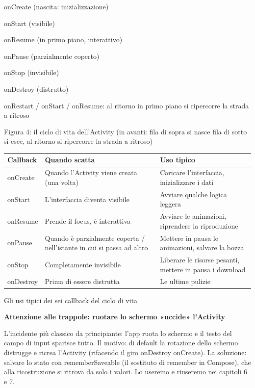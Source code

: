 onCreate (nascita: inizializzazione)

onStart (visibile)

onResume (in primo piano, interattivo)

onPause (parzialmente coperto)

onStop (invisibile)

onDestroy (distrutto)

onRestart / onStart / onResume: al ritorno in primo piano si ripercorre la strada a ritroso

\begin{center}\small\color{gray}Figura 4: il ciclo di vita dell'Activity (in avanti: fila di sopra si nasce fila di sotto si esce, al ritorno si ripercorre la strada a ritroso)\end{center}

\begin{center}
\begin{tabularx}{\linewidth}{|X|X|X|}
\hline
\textbf{Callback} & \textbf{Quando scatta} & \textbf{Uso tipico} \tabularnewline
\hline
onCreate & Quando l'Activity viene creata (una volta) & Caricare l'interfaccia, inizializzare i dati \tabularnewline
onStart & L'interfaccia diventa visibile & Avviare qualche logica leggera \tabularnewline
onResume & Prende il focus, è interattiva & Avviare le animazioni, riprendere la riproduzione \tabularnewline
onPause & Quando è parzialmente coperta / nell'istante in cui si passa ad altro & Mettere in pausa le animazioni, salvare la bozza \tabularnewline
onStop & Completamente invisibile & Liberare le risorse pesanti, mettere in pausa i download \tabularnewline
onDestroy & Prima di essere distrutta & Le ultime pulizie \tabularnewline
\hline
\end{tabularx}
\end{center}

\begin{center}\small\color{gray}Gli usi tipici dei sei callback del ciclo di vita\end{center}

\textbf{Attenzione alle trappole: ruotare lo schermo «uccide» l'Activity}\par

L'incidente più classico da principiante: l'app ruota lo schermo e il testo del campo di input sparisce tutto. Il motivo: di default la rotazione dello schermo distrugge e ricrea l'Activity (rifacendo il giro onDestroy onCreate). La soluzione: salvare lo stato con rememberSaveable (il sostituto di remember in Compose), che alla ricostruzione si ritrova da solo i valori. Lo useremo e riuseremo nei capitoli 6 e 7.

